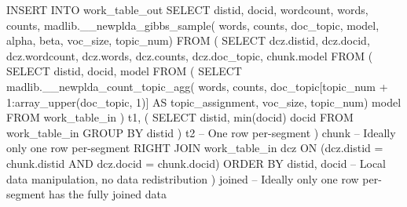 \begin{sql}[emph={work_table_out,work_table_in,__newplda_gibbs_sample,__newplda_count_topic_agg,model}]
    INSERT INTO work_table_out
    SELECT  
        distid, 
        docid, 
        wordcount, 
        words, 
        counts,  
        madlib.__newplda_gibbs_sample(
            words, 
            counts, 
            doc_topic, 
            model, 
            alpha, 
            beta, 
            voc_size, 
            topic_num)    
    FROM
    (
        SELECT
            dcz.distid, 
            dcz.docid, 
            dcz.wordcount, 
            dcz.words,
            dcz.counts, 
            dcz.doc_topic, 
            chunk.model 
        FROM
        (
            SELECT
                distid, docid, model
            FROM
            (
                SELECT
                    madlib.__newplda_count_topic_agg(
                        words, 
                        counts,
                        doc_topic[topic_num + 1:array_upper(doc_topic, 1)] AS topic_assignment, 
                        voc_size, 
                        topic_num) model 
                FROM
                    work_table_in 
            ) t1,
            (
                SELECT
                    distid, 
                    min(docid) docid 
                FROM
                    work_table_in 
                GROUP BY distid
            ) t2 -- One row per-segment
        ) chunk -- Ideally only one row per-segment
        RIGHT JOIN work_table_in dcz 
        ON (dcz.distid = chunk.distid AND dcz.docid = chunk.docid)
        ORDER BY distid, docid -- Local data manipulation, no data redistribution
    ) joined -- Ideally only one row per-segment has the fully joined data 
\end{sql}
